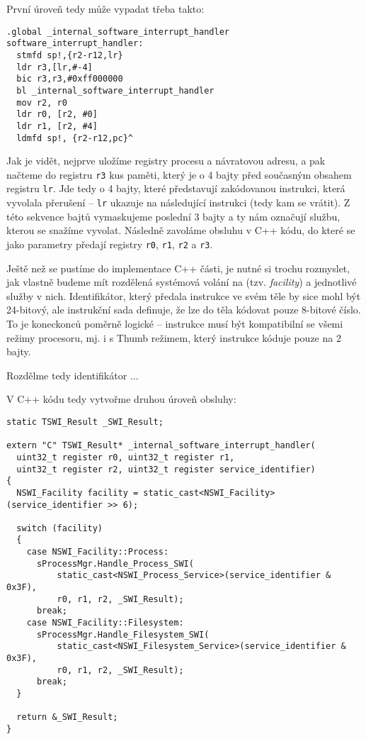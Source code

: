 \documentclass{article}
\begin{document}
První úroveň tedy může vypadat třeba takto:
\begin{lstlisting}
.global _internal_software_interrupt_handler
software_interrupt_handler:
  stmfd sp!,{r2-r12,lr}
  ldr r3,[lr,#-4]
  bic r3,r3,#0xff000000
  bl _internal_software_interrupt_handler
  mov r2, r0
  ldr r0, [r2, #0]
  ldr r1, [r2, #4]
  ldmfd sp!, {r2-r12,pc}^
\end{lstlisting}
Jak je vidět, nejprve uložíme registry procesu a návratovou adresu, a pak načteme do registru \texttt{r3} kus paměti, který je o 4 bajty před současným obsahem registru \texttt{lr}. Jde tedy o 4 bajty, které představují zakódovanou instrukci, která vyvolala přerušení -- \texttt{lr} ukazuje na následující instrukci (tedy kam se vrátit). Z této sekvence bajtů vymaskujeme poslední 3 bajty a ty nám označují službu, kterou se snažíme vyvolat. Následně zavoláme obsluhu v C++ kódu, do které se jako parametry  předají registry \texttt{r0}, \texttt{r1}, \texttt{r2} a \texttt{r3}.

Ještě než se pustíme do implementace C++ části, je nutné si trochu rozmyslet, jak vlastně budeme mít rozdělená systémová volání na  (tzv. \emph{facility}) a jednotlivé služby v nich. Identifikátor, který předala instrukce ve svém těle by sice mohl být 24-bitový, ale instrukční sada definuje, že lze do těla kódovat pouze 8-bitové číslo. To je koneckonců poměrně logické -- instrukce musí být kompatibilní se všemi režimy procesoru, mj. i s Thumb režimem, který instrukce kóduje pouze na 2 bajty.

Rozdělme tedy identifikátor ...


V C++ kódu tedy vytvořme druhou úroveň obsluhy:

\begin{lstlisting}
static TSWI_Result _SWI_Result;

extern "C" TSWI_Result* _internal_software_interrupt_handler(
  uint32_t register r0, uint32_t register r1,
  uint32_t register r2, uint32_t register service_identifier)
{
  NSWI_Facility facility = static_cast<NSWI_Facility>(service_identifier >> 6);
	
  switch (facility)
  {
    case NSWI_Facility::Process:
      sProcessMgr.Handle_Process_SWI(
          static_cast<NSWI_Process_Service>(service_identifier & 0x3F),
          r0, r1, r2, _SWI_Result);
      break;
    case NSWI_Facility::Filesystem:
      sProcessMgr.Handle_Filesystem_SWI(
          static_cast<NSWI_Filesystem_Service>(service_identifier & 0x3F),
          r0, r1, r2, _SWI_Result);
      break;
  }
	
  return &_SWI_Result;
}
\end{lstlisting}
\end{document}
